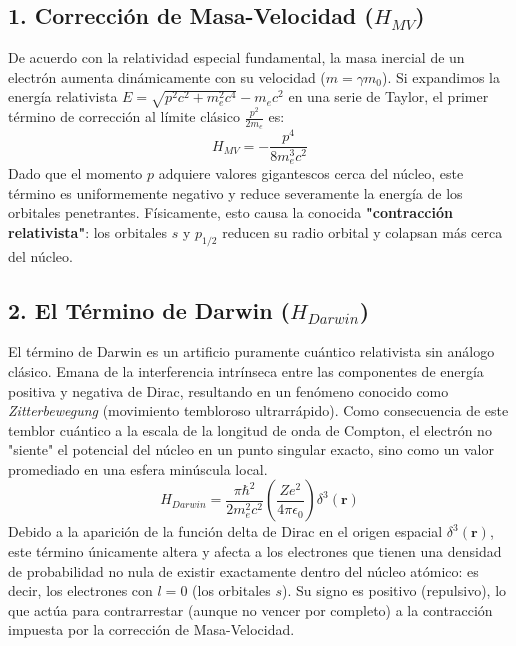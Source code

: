 \documentclass[11pt,a4paper]{article}
\begin{document}
\subsection{1. Corrección de Masa-Velocidad ($H_{MV}$)}
De acuerdo con la relatividad especial fundamental, la masa inercial de un electrón aumenta dinámicamente con su velocidad ($m = \gamma m_0$). Si expandimos la energía relativista $E = \sqrt{p^2c^2 + m_e^2c^4} - m_ec^2$ en una serie de Taylor, el primer término de corrección al límite clásico $\frac{p^2}{2m_e}$ es:
\begin{equation}
H_{MV} = -\frac{p^4}{8 m_e^3 c^2}
\end{equation}
Dado que el momento $p$ adquiere valores gigantescos cerca del núcleo, este término es uniformemente negativo y reduce severamente la energía de los orbitales penetrantes. Físicamente, esto causa la conocida \textbf{"contracción relativista"}: los orbitales $s$ y $p_{1/2}$ reducen su radio orbital y colapsan más cerca del núcleo.

\subsection{2. El Término de Darwin ($H_{Darwin}$)}
El término de Darwin es un artificio puramente cuántico relativista sin análogo clásico. Emana de la interferencia intrínseca entre las componentes de energía positiva y negativa de Dirac, resultando en un fenómeno conocido como \textit{Zitterbewegung} (movimiento tembloroso ultrarrápido). Como consecuencia de este temblor cuántico a la escala de la longitud de onda de Compton, el electrón no "siente" el potencial del núcleo en un punto singular exacto, sino como un valor promediado en una esfera minúscula local.
\begin{equation}
H_{Darwin} = \frac{\pi \hbar^2}{2 m_e^2 c^2} \left( \frac{Ze^2}{4\pi\epsilon_0} \right) \delta^3(\mathbf{r})
\end{equation}
Debido a la aparición de la función delta de Dirac en el origen espacial $\delta^3(\mathbf{r})$, este término únicamente altera y afecta a los electrones que tienen una densidad de probabilidad no nula de existir exactamente dentro del núcleo atómico: es decir, los electrones con $l=0$ (los orbitales $s$). Su signo es positivo (repulsivo), lo que actúa para contrarrestar (aunque no vencer por completo) a la contracción impuesta por la corrección de Masa-Velocidad.
\end{document}
